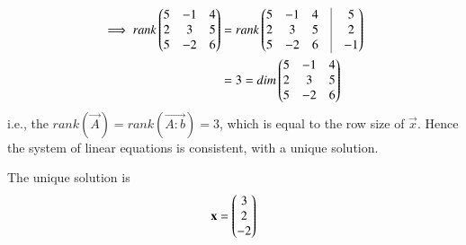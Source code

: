 \begin{align}
	\implies rank \myvec{ 5 & -1 & 4 \\ 2 &  3 & 5 \\ 5 & -2 & 6 }
		&=
	rank \myvec{ 5 & -1 & 4 &\vrule & 5 \\ 2 & 3 & 5 &\vrule & 2 \\ 5 & -2 & 6 &\vrule & -1}
		\nonumber \\
	&= 3 = dim \myvec{ 5 & -1 & 4 \\ 2 &  3 & 5 \\ 5 & -2 & 6 }
\end{align}
i.e., the $rank(\vec{A}) = rank(\vec{A:b}) = 3$, which is equal to the row size of $\vec{x}$. Hence the system of linear equations is consistent, with a unique solution. 

The unique solution is 
\begin{align}
	\mathbf{x} = \begin{pmatrix}3\\2\\-2\end{pmatrix}
\end{align}
